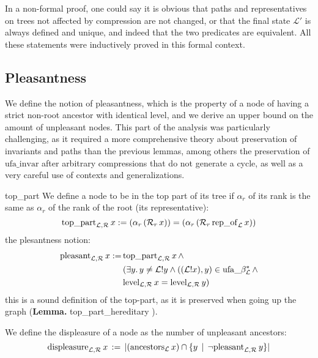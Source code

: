\documentclass[headsepline,footsepline,footinclude=false,oneside,fontsize=11pt,paper=a4,listof=totoc,bibliography=totoc]{scrbook} %
\begin{document}
In a non-formal proof, one could say it is obvious that paths and representatives on trees not affected by compression are not changed, or that the final state $\mathcal{L}'$ is always defined and unique, and indeed that the two predicates are equivalent. All these statements were inductively proved in this formal context. 


\subsection{Pleasantness}

We define the notion of pleasantness, which is the property of a node of having a strict non-root ancestor with identical level, and we derive an upper bound on the amount of unpleasant nodes. This part of the analysis was particularly challenging, as it required a more comprehensive theory about preservation of invariants and paths than the previous lemmas, among others the preservation of $\mathrm{ufa\_invar}$ after arbitrary compressions that do not generate a cycle, as well as a very careful use of contexts and generalizations.

\begin{definition}{top\_part}\newline
	We define a node to be in the top part of its tree if $\alpha_r$ of its rank is the same as $\alpha_r$ of the rank of the root (its representative):
	\begin{equation}
	\mathrm{top\_part}_{\mathcal{L},\mathcal{R}}\, x := (\alpha_r\, (\mathcal{R}_r\, x)) = (\alpha_r\, (\mathcal{R}_r\, \mathrm{rep\_of}_\mathcal{L}\, x))
	\end{equation}
	the plesantness notion:
	\begin{align}
	\begin{split}
	\mathrm{pleasant}_{\mathcal{L},\mathcal{R}}\, x := \, & \mathrm{top\_part}_{\mathcal{L},\mathcal{R}}\, x \, \land \\
			& (\exists y.\, y\neq \mathcal{L}!y \land ((\mathcal{L}!x),y)\in\mathrm{ufa\_}\beta^*_\mathcal{L} \,\land \\
			& \mathrm{level}_{\mathcal{L},\mathcal{R}}\, x = \mathrm{level}_{\mathcal{L},\mathcal{R}}\, y)
	\end{split}
	\end{align}
	this is a sound definition of the top-part, as it is preserved when going up the graph (\textbf{Lemma.} top\_part\_hereditary \eqnum).
	
	We define the displeasure of a node as the number of unpleasant ancestors:
	\begin{equation}
	\mathrm{displeasure}_{\mathcal{L},\mathcal{R}}\, x\, := \, |(\mathrm{ancestors}_{\mathcal{L}}\, x) \cap \{y\,\mid\, \lnot \mathrm{pleasant}_{\mathcal{L},\mathcal{R}}\, y\}|
	\end{equation}
\end{definition}
\end{document}
